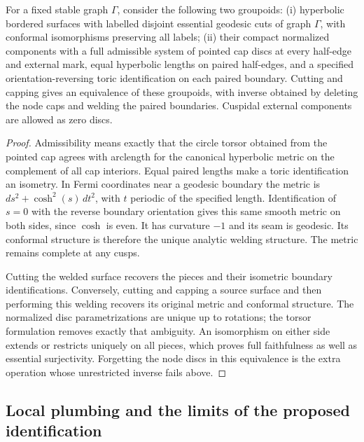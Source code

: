 \begin{theorem}\label{A:fullcaps}
For a fixed stable graph $\Gamma$, consider the following two groupoids:
(i) hyperbolic bordered surfaces with labelled disjoint essential
geodesic cuts of graph $\Gamma$, with conformal isomorphisms preserving
all labels; (ii) their compact normalized components with a full
admissible system of pointed cap discs at every half-edge and external
mark, equal hyperbolic lengths on paired half-edges, and a specified
orientation-reversing toric identification on each paired boundary.
Cutting and capping gives an equivalence of these groupoids, with
inverse obtained by deleting the node caps and welding the paired
boundaries. Cuspidal external components are allowed as zero discs.
\end{theorem}
\begin{proof}
Admissibility means exactly that the circle torsor obtained from the
pointed cap agrees with arclength for the canonical hyperbolic metric
on the complement of all cap interiors. Equal paired lengths make a
toric identification an isometry. In Fermi coordinates near a
geodesic boundary the metric is
$ds^2+\cosh^2(s)\,dt^2$, with $t$ periodic of the specified length.
Identification of $s=0$ with the reverse boundary orientation gives
this same smooth metric on both sides, since $\cosh$ is even. It has
curvature $-1$ and its seam is geodesic. Its conformal structure is
therefore the unique analytic welding structure. The metric remains
complete at any cusps.

Cutting the welded surface recovers the pieces and their isometric
boundary identifications. Conversely, cutting and capping a source
surface and then performing this welding recovers its original
metric and conformal structure. The normalized disc parametrizations
are unique up to rotations; the torsor formulation removes exactly
that ambiguity. An isomorphism on either side extends or restricts
uniquely on all pieces, which proves full faithfulness as well as
essential surjectivity. Forgetting the node discs in this equivalence
is the extra operation whose unrestricted inverse fails above.
\end{proof}



\subsection{Local plumbing and the limits of the proposed identification}

